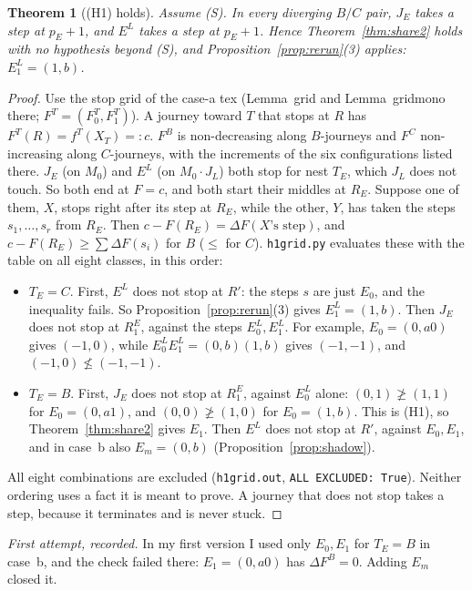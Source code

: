 \documentclass[11pt]{article}
\newtheorem{theorem}{Theorem}\newtheorem{lemma}[theorem]{Lemma}\newtheorem{proposition}[theorem]{Proposition}
\theoremstyle{definition}\newtheorem{definition}[theorem]{Definition}\newtheorem{remark}[theorem]{Remark}
\begin{document}
\begin{theorem}[(H1) holds]\label{thm:h1}
Assume (S). In every diverging $B/C$ pair, $J_E$ takes a step at $p_E+1$, and $E^L$ takes a step at $p_E+1$. Hence Theorem~\ref{thm:share2} holds with no hypothesis beyond (S), and Proposition~\ref{prop:rerun}(3) applies: $E^L_1=(1,b)$.
\end{theorem}
\begin{proof}
Use the stop grid of the case-a tex (Lemma~grid and Lemma~gridmono there; $F^T=(F^T_0,F^T_1)$). A journey toward $T$ that stops at $R$ has $F^T(R)=f^T(X_T)=:c$. $F^B$ is non-decreasing along $B$-journeys and $F^C$ non-increasing along $C$-journeys, with the increments of the six configurations listed there. $J_E$ (on $M_0$) and $E^L$ (on $M_0\cdot J_L$) both stop for nest $T_E$, which $J_L$ does not touch. So both end at $F=c$, and both start their middles at $R_E$. Suppose one of them, $X$, stops right after its step at $R_E$, while the other, $Y$, has taken the steps $s_1,\dots,s_r$ from $R_E$. Then $c-F(R_E)=\Delta F(X\text{'s step})$, and $c-F(R_E)\ge\sum\Delta F(s_i)$ for $B$ ($\le$ for $C$). \texttt{h1grid.py} evaluates these with the table on all eight classes, in this order:
\begin{itemize}
\item $T_E=C$. First, $E^L$ does not stop at $R'$: the steps $s$ are just $E_0$, and the inequality fails. So Proposition~\ref{prop:rerun}(3) gives $E^L_1=(1,b)$. Then $J_E$ does not stop at $R^E_1$, against the steps $E^L_0,E^L_1$. For example, $E_0=(0,a0)$ gives $(-1,0)$, while $E^L_0E^L_1=(0,b)(1,b)$ gives $(-1,-1)$, and $(-1,0)\not\le(-1,-1)$.
\item $T_E=B$. First, $J_E$ does not stop at $R^E_1$, against $E^L_0$ alone: $(0,1)\not\ge(1,1)$ for $E_0=(0,a1)$, and $(0,0)\not\ge(1,0)$ for $E_0=(1,b)$. This is (H1), so Theorem~\ref{thm:share2} gives $E_1$. Then $E^L$ does not stop at $R'$, against $E_0,E_1$, and in case~b also $E_m=(0,b)$ (Proposition~\ref{prop:shadow}).
\end{itemize}
All eight combinations are excluded (\texttt{h1grid.out}, \texttt{ALL EXCLUDED: True}). Neither ordering uses a fact it is meant to prove. A journey that does not stop takes a step, because it terminates and is never stuck.
\end{proof}
\noindent\emph{First attempt, recorded.} In my first version I used only $E_0,E_1$ for $T_E=B$ in case~b, and the check failed there: $E_1=(0,a0)$ has $\Delta F^B=0$. Adding $E_m$ closed it.
\end{document}
